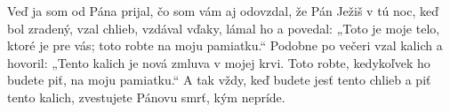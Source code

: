 Veď ja som od Pána prijal, čo som vám aj odovzdal, že Pán Ježiš v tú noc, keď bol zradený, vzal chlieb,
vzdával vďaky, lámal ho a povedal: „Toto je moje telo, ktoré je pre vás; toto robte na moju pamiatku.“ 
Podobne po večeri vzal kalich a hovoril: „Tento kalich je nová zmluva v mojej krvi. Toto robte, kedykoľvek ho budete piť, na moju pamiatku.“ 
A tak vždy, keď budete jesť tento chlieb a piť tento kalich, zvestujete Pánovu smrť, kým nepríde. 